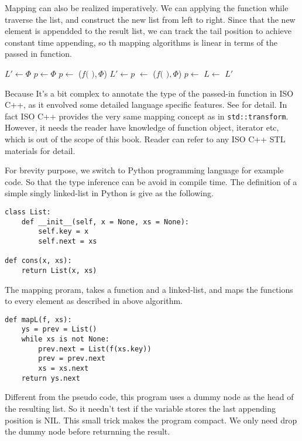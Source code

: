 \documentclass{article}
\begin{document}
Mapping can also be realized imperatively. We can applying the
function while traverse the list, and construct the new list from left to right.
Since that the new element is appendded to the result list, we can track the tail
position to achieve constant time appending, so th mapping algorithms is linear in
terms of the passed in function.

\begin{algorithmic}
  \State $L' \gets \Phi$
  \State $p \gets \Phi$
      \State $p \gets$ ($f($  $), \Phi$)
      \State $L' \gets p$
    \Else
      \State {} $\gets$ ($f($  $), \Phi$)
      \State $p \gets$ 
    \EndIf
    \State $L \gets$ 
  \EndWhile
  \State \Return $L'$
\EndFunction
\end{algorithmic}

Because It's a bit complex to annotate the type of the passed-in function in ISO C++, as it
envolved some detailed language specific features. See \cite{sgi-stl-transform} for detail. 
In fact ISO C++ provides the very same mapping concept as in \verb|std::transform|. However, 
it needs the reader have knowledge of function object, iterator etc, which is out of the
scope of this book. Reader can refer to any ISO C++ STL materials for detail.

For brevity purpose, we switch to Python programming language for example code. So that the type inference
can be avoid in compile time. The definition of a simple singly linked-list in Python is give as the 
following.

\lstset{language=Python}
\begin{lstlisting}
class List:
    def __init__(self, x = None, xs = None):
        self.key = x
        self.next = xs

def cons(x, xs):
    return List(x, xs)
\end{lstlisting}

The mapping proram, takes a function and a linked-list, and maps the functions to every element as described
in above algorithm.

\begin{lstlisting}
def mapL(f, xs):
    ys = prev = List()
    while xs is not None:
        prev.next = List(f(xs.key))
        prev = prev.next
        xs = xs.next
    return ys.next
\end{lstlisting}

Different from the pseudo code, this program uses a dummy node as the head of the resulting list. So it needn't
test if the variable stores the last appending position is NIL. This small trick makes the program compact. 
We only need drop the dummy node before returnning the result.
\end{document}
